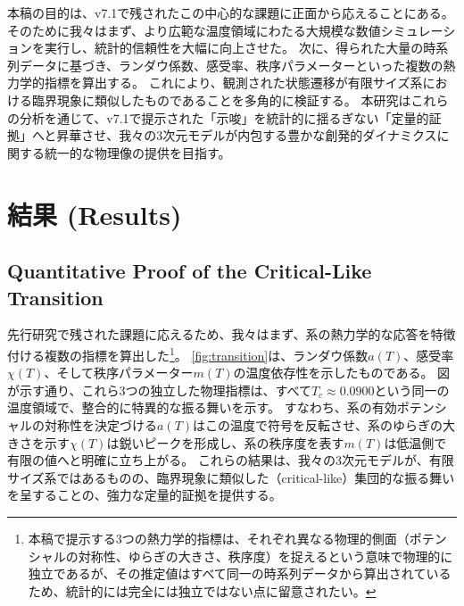 \documentclass[a4paper,11pt,ja=standard,lualatex]{bxjsarticle}
\newcommand{\figref}[1]{\cref{#1}}
\begin{document}
本稿の目的は、v7.1\!で残されたこの中心的な課題に正面から応えることにある。
そのために我々はまず、より広範な温度領域にわたる大規模な数値シミュレーションを実行し、統計的信頼性を大幅に向上させた。
次に、得られた大量の時系列データに基づき、ランダウ係数、感受率、秩序パラメーターといった複数の熱力学的指標を算出する。
これにより、観測された状態遷移が有限サイズ系における臨界現象に類似したものであることを多角的に検証する。
本研究はこれらの分析を通じて、v7.1\!で提示された「示唆」を統計的に揺るぎない「定量的証拠」へと昇華させ、我々の3次元モデルが内包する豊かな創発的ダイナミクスに関する統一的な物理像の提供を目指す。

\FloatBarrier

\section{結果 (Results)}
\label{sec:results}

\subsection{Quantitative Proof of the Critical-Like Transition}
\label{subsec:transition_proof}
先行研究で残された課題に応えるため、我々はまず、系の熱力学的な応答を特徴付ける複数の指標を算出した\footnote{本稿で提示する3つの熱力学的指標は、それぞれ異なる物理的側面（ポテンシャルの対称性、ゆらぎの大きさ、秩序度）を捉えるという意味で物理的に独立であるが、その推定値はすべて同一の時系列データから算出されているため、統計的には完全には独立ではない点に留意されたい。}。
\figref{fig:transition}は、ランダウ係数$a(T)$、感受率$\chi(T)$、そして秩序パラメーター$m(T)$の温度依存性を示したものである。
図が示す通り、これら3つの独立した物理指標は、すべて$T_c \approx 0.0900$という同一の温度領域で、整合的に特異的な振る舞いを示す。
すなわち、系の有効ポテンシャルの対称性を決定づける$a(T)$はこの温度で符号を反転させ、系のゆらぎの大きさを示す$\chi(T)$は鋭いピークを形成し、系の秩序度を表す$m(T)$は低温側で有限の値へと明確に立ち上がる。
これらの結果は、我々の3次元モデルが、有限サイズ系ではあるものの、臨界現象に類似した（critical-like）集団的な振る舞いを呈することの、強力な定量的証拠を提供する。
\end{document}
